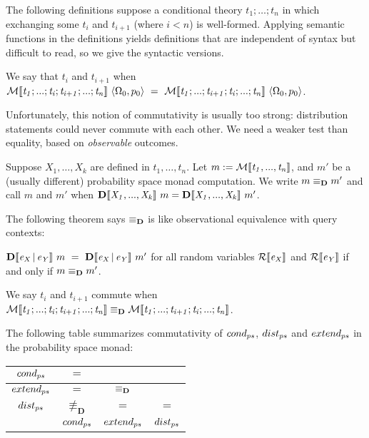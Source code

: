 The following definitions suppose a conditional theory $\mathit{t_1;\dots;t_n}$ in which exchanging some $\mathit{t_i}$ and $\mathit{t_{i+1}}$ (where $\mathit{i < n}$) is well-formed. Applying semantic functions in the definitions yields definitions that are independent of syntax but difficult to read, so we give the syntactic versions.

\begin{definition}[commutativity]
We say that $\mathit{t_i}$ and $\mathit{t_{i+1}}$  when \\ $\app {\PS{\mathit{t_1;\dots;t_i;t_{i+1};\dots;t_n}}} {\seq{\Omega_0,p_0}}\ =\ \app {\PS{\mathit{t_1;\dots;t_{i+1};t_i;\dots;t_n}}} {\seq{\Omega_0,p_0}}$.
\end{definition}

Unfortunately, this notion of commutativity is usually too strong: distribution statements could never commute with each other. We need a weaker test than equality, based on \emph{observable} outcomes.

\begin{definition}
Suppose $\mathit{X_1,\dots,X_k}$ are defined in $\mathit{t_1,\dots,t_n}$. Let $m := \mathcal{M}\!\left\llbracket{\mathit{t_1,...,t_n}}\right\rrbracket$, and $m'$ be a (usually different) probability space monad computation. We write $m \equiv_\mathbf{D} m'$ and call $m$ and $m'$  when ${\mathbf{D}\!\left\llbracket{\mathit{X_1,...,X_k}}\right\rrbracket}\ {m} = {\mathbf{D}\!\left\llbracket{\mathit{X_1,...,X_k}}\right\rrbracket}\ {m'}$.
\end{definition}

The following theorem says $\equiv_\mathbf{D}$ is like observational equivalence with query contexts:

\begin{theorem}[context]
\label{thm:context}
${\mathbf{D}\!\left\llbracket{\mathit{e_X \,|\,e_Y}}\right\rrbracket}\ {m}\ =\ {\mathbf{D}\!\left\llbracket{\mathit{e_X \,|\,e_Y}}\right\rrbracket}\ {m'}$ for all random variables $\mathcal{R}\!\left\llbracket{\mathit{e_X}}\right\rrbracket$ and $\mathcal{R}\!\left\llbracket{\mathit{e_Y}}\right\rrbracket$ if and only if $m \equiv_\mathbf{D} m'$.
\end{theorem}

\begin{definition}
\label{def:commutativity-in-distribution}
We say $\mathit{t_i}$ and $\mathit{t_{i+1}}$ commute  when $\mathcal{M}\!\left\llbracket{\mathit{t_1;...;t_i;t_{i+1};...;t_n}}\right\rrbracket \equiv_\mathbf{D} \mathcal{M}\!\left\llbracket{\mathit{t_1;...;t_{i+1};t_i;...;t_n}}\right\rrbracket$.
\end{definition}

\begin{theorem}
\label{thm:commutativity}
The following table summarizes commutativity of $cond_{ps}$, $dist_{ps}$ and $extend_{ps}$ in the probability space monad:
\begin{center}
\begin{tabular}{c|c|c|c}
	$cond_{ps}$ & $=$ & & \\
	\hline
	$extend_{ps}$ & $=$ & $\equiv_\mathbf{D}$ & \\
	\hline
	$dist_{ps}$ & $\not\equiv_{\mathbf{D}}$ & $=$ & $=$\\
	\hline
	 & $cond_{ps}$ & $extend_{ps}$ & $dist_{ps}$
\end{tabular}
\end{center}
\end{theorem}

